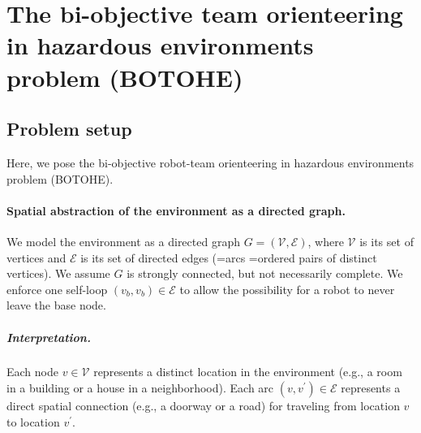 \documentclass[11pt, oneside]{article}
\begin{document}
\section{The bi-objective team orienteering in hazardous environments problem (BOTOHE)}




\subsection{Problem setup}
Here, we pose the bi-objective robot-team orienteering in hazardous environments problem (BOTOHE).

\paragraph{Spatial abstraction of the environment as a directed graph.}
We model the environment as a directed graph $G=(\mathcal{V}, \mathcal{E})$, where $\mathcal{V}$ is its set of vertices and $\mathcal{E}$ is its set of directed edges (=arcs =ordered pairs of distinct vertices). We assume $G$ is strongly connected, but not necessarily complete. We enforce one self-loop $(v_b, v_b) \in \mathcal{E}$ to allow the possibility for a robot to never leave the base node.

\vspace{-\baselineskip}
\subparagraph{Interpretation.} 
Each node $v\in \mathcal{V}$ represents a distinct location in the environment (e.g., a room in a building or a house in a neighborhood).
Each arc $(v, v^\prime) \in \mathcal{E}$ represents a direct spatial connection (e.g., a doorway or a road) for traveling from location $v$ to location $v^\prime$.


\end{document}
